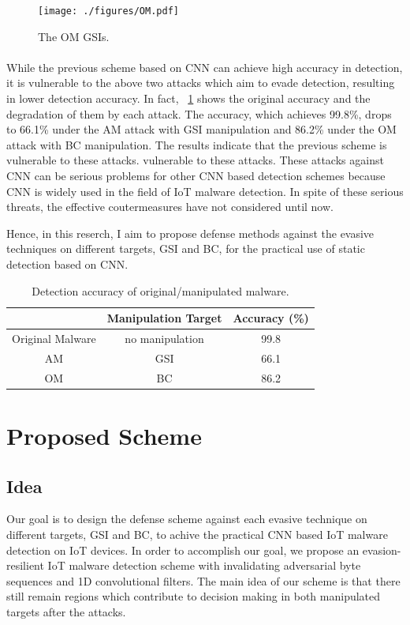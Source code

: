 \documentclass{ieeeaccess}
\begin{document}
\begin{figure}[t]
 \centering
 \texttt{[image: ./figures/OM.pdf]}
 \caption{The OM GSIs.} 
 \label{fig:omGSI}
\end{figure}

\paragraph*{}
While the previous scheme based on CNN can achieve high accuracy in detection, it is vulnerable to the above two attacks which aim to evade detection, resulting in lower detection accuracy.
In fact, \tablename~\ref{tab:prev} shows the original accuracy and the degradation of them by each attack.
The accuracy, which achieves 99.8\%, drops to 66.1\% under the AM attack with GSI manipulation and 86.2\% under the OM attack with BC manipulation.
The results indicate that the previous scheme is vulnerable to these attacks.
vulnerable to these attacks.
These attacks against CNN can be serious problems for other CNN based detection schemes because CNN is widely used in the field of IoT malware detection.
In spite of these serious threats, the effective coutermeasures have not considered until now.

Hence, in this reserch, I aim to propose defense methods against the evasive techniques on different targets, GSI and BC, for the practical use of static detection based on CNN.

\begin{table}[h]
  \begin{center}
    \caption{Detection accuracy of original/manipulated malware.}
    \label{tab:prev} 
    \begin{tabular}{|c|c|c|} \hline
       & Manipulation Target & Accuracy (\%) \\ \hline \hline
      Original Malware & no manipulation  & 99.8  \\ \hline
      AM & GSI & 66.1  \\ \hline 
      OM & BC & 86.2 \\ \hline
    \end{tabular}
  \end{center}
\end{table} 

\section{Proposed Scheme} \label{sec:proposed_scheme}
\subsection{Idea}
Our goal is to design the defense scheme against each evasive technique on different targets, GSI and BC, to achive the practical CNN based IoT malware detection on IoT devices.
In order to accomplish our goal, we propose an evasion-resilient IoT malware detection scheme with invalidating adversarial byte sequences and 1D convolutional filters.
The main idea of our scheme is that there still remain regions which contribute to decision making in both manipulated targets after the attacks.
\end{document}
